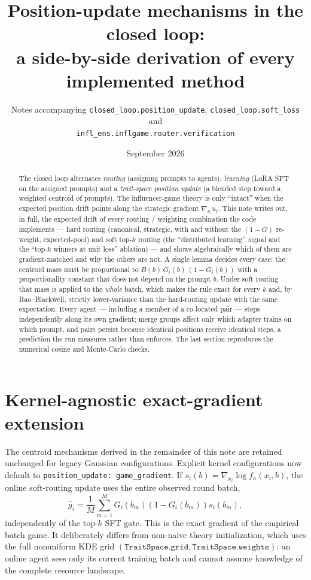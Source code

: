 \documentclass[11pt]{article}
\title{Position-update mechanisms in the closed loop:\\
a side-by-side derivation of every implemented method}
\author{Notes accompanying \texttt{closed\_loop.position\_update},
\texttt{closed\_loop.soft\_loss} and\\
\texttt{infl\_ens.inflgame.router.verification}}
\date{September 2026}
\theoremstyle{remark}
\newcommand{\cfg}[1]{\texttt{#1}}
\begin{document}
\maketitle

\begin{abstract}
The closed loop alternates \emph{routing} (assigning prompts to agents),
\emph{learning} (LoRA SFT on the assigned prompts) and a
\emph{trait-space position update} (a blended step toward a weighted centroid
of prompts). The influencer-game theory is only ``intact'' when the expected
position drift points along the strategic gradient $\nabla_{x_i}u_i$. This
note writes out, in full, the expected drift of every routing / weighting
combination the code implements --- hard routing (canonical, strategic, with
and without the $(1-G)$ re-weight, expected-pool) and soft top-$k$ routing
(the ``distributed learning'' signal and the ``top-$k$ winners at unit loss''
ablation) --- and shows algebraically which of them are gradient-matched and
why the others are not. A single lemma decides every case: the centroid mass
must be proportional to $B(b)\,G_i(b)\,(1-G_i(b))$ with a proportionality
constant that does not depend on the prompt $b$. Under soft routing that
mass is applied to the \emph{whole} batch, which makes the rule exact for
every $k$ and, by Rao--Blackwell, strictly lower-variance than the
hard-routing update with the same expectation. Every agent --- including a
member of a co-located pair --- steps independently along its own gradient;
merge groups affect only which adapter trains on which prompt, and pairs
persist because identical positions receive identical steps, a prediction
the run measures rather than enforces. The last section reproduces the
numerical cosine and Monte-Carlo checks.
\end{abstract}

\tableofcontents

\section{Kernel-agnostic exact-gradient extension}

The centroid mechanisms derived in the remainder of this note are retained
unchanged for legacy Gaussian configurations.  Explicit kernel configurations
now default to \cfg{position\_update: game\_gradient}.  If
$s_i(b)=\nabla_{x_i}\log f_\kappa(x_i,b)$, the online soft-routing update uses
the entire observed round batch,
\[
 \widehat g_i=\frac1M\sum_{m=1}^M
 G_i(b_m)(1-G_i(b_m))s_i(b_m),
\]
independently of the top-$k$ SFT gate.  This is the exact gradient of the
empirical batch game.  It deliberately differs from non-naive theory
initialization, which uses the full nonuniform KDE grid
$(\cfg{TraitSpace.grid},\cfg{TraitSpace.weights})$: an online agent sees only
its current training batch and cannot assume knowledge of the complete
resource landscape.
\end{document}
